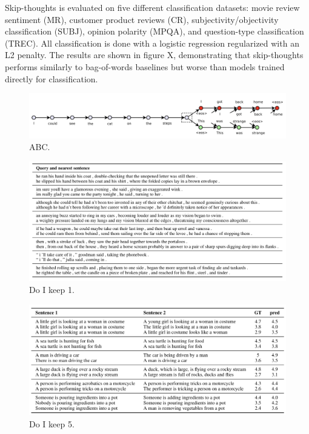 Skip-thoughts is evaluated on five different classification datasets: movie review sentiment (MR), customer product reviews (CR), subjectivity/objectivity classification (SUBJ), opinion polarity (MPQA), and question-type classification (TREC). All classification is done with a logistic regression regularized with an L2 penalty. The results are shown in figure X, demonstrating that skip-thoughts performs similarly to bag-of-words baselines but worse than models trained directly for classification.

\begin{figure}
\centering
  \includegraphics[width=.8\linewidth]{files/skipthoughts-1.png}
  \caption{ABC.}
  \label{fig:skipthoughts-1}
\end{figure}

\begin{figure}
\centering
  \includegraphics[width=.8\linewidth]{files/skipthoughts-2.png}
  \caption{Do I keep 1.}
  \label{fig:vae}
\end{figure}

\begin{figure}
\centering
  \includegraphics[width=.8\linewidth]{files/skipthoughts-5.png}
  \caption{Do I keep 5.}
  \label{fig:vae}
\end{figure}


